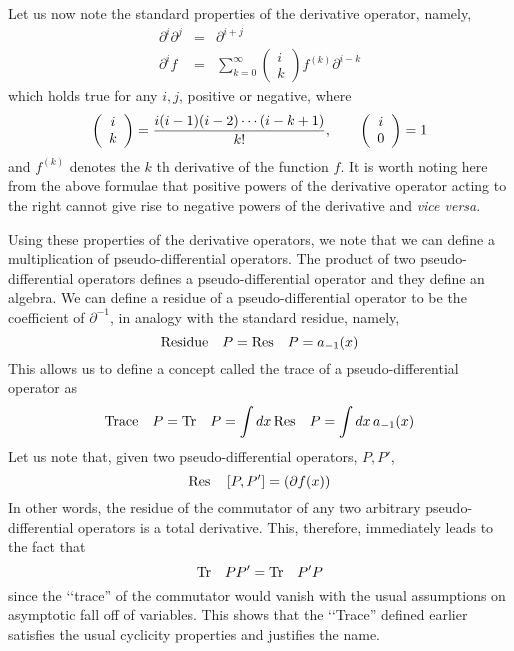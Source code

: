 \documentclass[a4paper,11pt]{article}
\begin{document}
Let us now note the standard properties of the derivative operator,
namely,
\begin{eqnarray}
\partial^{i} \partial^{j} & = & \partial^{i+j}\nonumber\\
\partial^{i} f & = & \sum_{k=0}^{\infty} \left(\begin{array}{c}
i\\
k
\end{array}\right) f^{(k)} \partial^{i-k}
\end{eqnarray}
which holds true for any $i,j$, positive or negative, where
\begin{equation}
\left(\begin{array}{c}
i\\
k
\end{array}\right) = {i (i-1) (i-2) \cdots (i-k+1)\over k!},\qquad
\left(\begin{array}{c}
i\\
0
\end{array}\right) = 1
\end{equation}
and $f^{(k)}$ denotes the $k$ th derivative of the function $f$. It is
worth noting here from the above formulae that positive powers of the
derivative operator acting to the right cannot give rise to negative
powers of the derivative and {\em vice versa}.

Using these properties of the derivative operators, we note that we
can define a multiplication of pseudo-differential operators. The
product of two pseudo-differential operators defines a
pseudo-differential operator and
 they define an algebra. We can define a residue of a
pseudo-differential operator to be the coefficient of $\partial^{-1}$,
in analogy with the standard residue, namely,
\begin{equation}
{\rm Residue}\quad P = {\rm Res}\quad P = a_{-1} (x)
\end{equation}
This allows us to define a concept called the trace of a
pseudo-differential operator as
\begin{equation}
{\rm Trace}\quad P = {\rm Tr}\quad P = \int dx\,{\rm Res}\quad P =
\int dx\, a_{-1}(x)
\end{equation}
Let us note that, given two pseudo-differential operators, $P,P'$,
\begin{equation}
{\rm Res}\quad \left[P , P'\right] = \left(\partial f(x)\right)
\end{equation}
In other words, the residue of the commutator of any two arbitrary
pseudo-differential operators is a total derivative. This, therefore,
immediately leads to the fact that
\begin{equation}
{\rm Tr}\quad PP' = {\rm Tr}\quad P'P
\end{equation}
since the \lq\lq trace'' of the commutator would vanish with the usual
assumptions on asymptotic fall off of variables. This shows that the
\lq\lq Trace'' defined earlier satisfies the usual cyclicity
properties and justifies the name.
\end{document}
